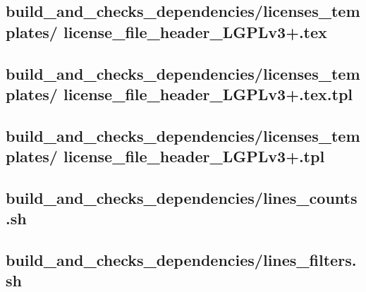 \documentclass{article}
\begin{document}


\subsection{
  build\_and\_checks\_dependencies/licenses\_templates/%
license\_file\_header\_LGPLv3+.tex
}
\label{
  build_and_checks_dependencies:licenses_templates:%
license_file_header_LGPLv3+tex
}



\subsection{
  build\_and\_checks\_dependencies/licenses\_templates/%
license\_file\_header\_LGPLv3+.tex.tpl
}
\label{
  build_and_checks_dependencies:licenses_templates:%
license_file_header_LGPLv3+textpl
}



\subsection{
  build\_and\_checks\_dependencies/licenses\_templates/%
license\_file\_header\_LGPLv3+.tpl
}
\label{
  build_and_checks_dependencies:licenses_templates:%
license_file_header_LGPLv3+tpl
}



\subsection{
  build\_and\_checks\_dependencies/lines\_counts.sh
}
\label{
  build_and_checks_dependencies:lines_countssh
}



\subsection{
  build\_and\_checks\_dependencies/lines\_filters.sh
}
\label{
  build_and_checks_dependencies:lines_filterssh
}
\end{document}
